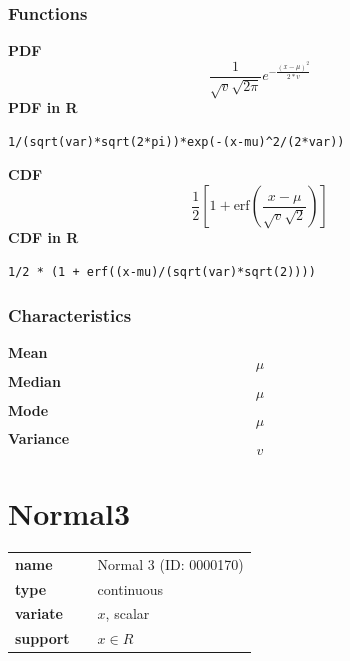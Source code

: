 \subsubsection*{Functions}

\smallskip \noindent \hspace{.2cm} \textbf{PDF} 
\begin{equation*}\frac{1}{\sqrt{v} \sqrt{2 \pi}}e^{-\frac{(x-\mu)^2}{2*v}}\end{equation*}
\smallskip \noindent \hspace{.2cm} \textbf{PDF in R}  
\begin{verbatim}1/(sqrt(var)*sqrt(2*pi))*exp(-(x-mu)^2/(2*var))\end{verbatim}
\smallskip \noindent \hspace{.2cm} \textbf{CDF} 
\begin{equation*}\frac12\left[1 + \text{erf}\left( \frac{x-\mu}{\sqrt{v}\sqrt{2}}\right)\right]\end{equation*}
\smallskip \noindent \hspace{.2cm} \textbf{CDF in R} 
\begin{verbatim}1/2 * (1 + erf((x-mu)/(sqrt(var)*sqrt(2))))\end{verbatim}
\smallskip
\subsubsection*{Characteristics}
\smallskip \noindent \hspace{.2cm} \textbf{Mean} 
\begin{equation*}\mu\end{equation*}
\smallskip \noindent \hspace{.2cm} \textbf{Median} 
\begin{equation*}\mu\end{equation*}
\smallskip \noindent \hspace{.2cm} \textbf{Mode} 
\begin{equation*}\mu\end{equation*}
\smallskip \noindent \hspace{.2cm} \textbf{Variance} 
\begin{equation*}v\end{equation*}
\smallskip
\section*{Normal3} 

  \bigskip 

\begin{tabular}{p{2cm}cl}
\textbf{name} & & Normal 3 (ID: 0000170)\\ 
 
\textbf{type} & & continuous \\ 

\textbf{variate} & & $x$, scalar \\ 

\textbf{support} & & $x \in R$
\end{tabular}

